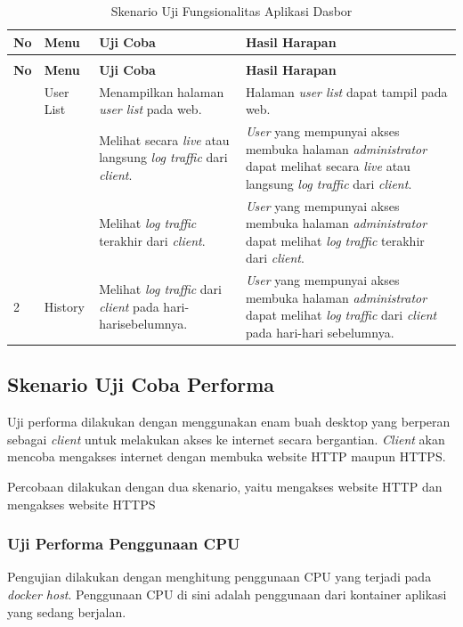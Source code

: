 \begin{longtable}{|p{}|p{}|p{}|p{}|}
	\caption{Skenario Uji Fungsionalitas Aplikasi Halaman \textit{Administrator}} \label{ujicoba5} \\
	\hline
	\textbf{No} & \textbf{Menu} & \textbf{Uji Coba} & \textbf{Hasil Harapan} \\ \hline
	\endfirsthead
	\caption[]{Skenario Uji Fungsionalitas Aplikasi Dasbor}  \\
	\hline
	\textbf{No} & \textbf{Menu} & \textbf{Uji Coba} & \textbf{Hasil Harapan} \\ \hline
	\endhead
	\endfoot
	\endlastfoot
	1 & User List & Menampilkan halaman \textit{user list} pada web. & Halaman \textit{user list} dapat tampil pada web. \\ \cline{3-4}
	&& Melihat secara \textit{live} atau langsung \textit{log traffic} dari \textit{client}. & \textit{User} yang mempunyai akses membuka halaman \textit{administrator} dapat melihat secara \textit{live} atau langsung \textit{log traffic} dari \textit{client}. \\ \cline{3-4}
	&& Melihat \textit{log traffic} terakhir dari \textit{client}. & \textit{User} yang mempunyai akses membuka halaman \textit{administrator} dapat melihat \textit{log traffic} terakhir dari \textit{client}. \\ \hline
	2 & History & Melihat \textit{log traffic} dari \textit{client} pada hari-harisebelumnya.  & \textit{User} yang mempunyai akses membuka halaman \textit{administrator} dapat melihat \textit{log traffic} dari \textit{client} pada hari-hari sebelumnya. \\ \hline
\end{longtable}

\subsection{Skenario Uji Coba Performa}
Uji performa dilakukan dengan menggunakan enam buah desktop yang berperan sebagai \textit{client} untuk melakukan akses ke internet secara bergantian. \textit{Client} akan mencoba mengakses internet dengan membuka website HTTP maupun HTTPS.

Percobaan dilakukan dengan dua skenario, yaitu mengakses website HTTP dan mengakses website HTTPS

\subsubsection{Uji Performa Penggunaan CPU}
Pengujian dilakukan dengan menghitung penggunaan CPU yang terjadi pada \textit{docker host}. Penggunaan CPU di sini adalah penggunaan dari kontainer aplikasi yang sedang berjalan. 

